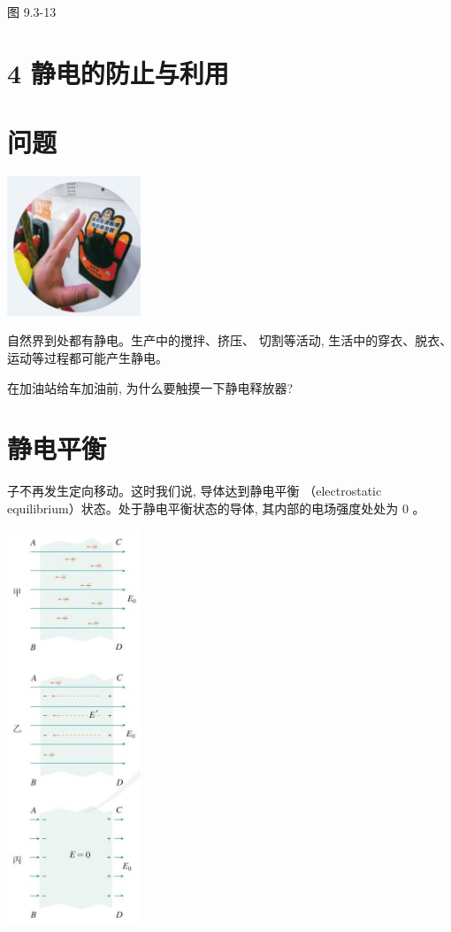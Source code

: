 \documentclass[10pt]{article}
\begin{document}
图 9.3-13

\section*{4 静电的防止与利用}

\section*{问题}

\begin{center}
\includegraphics[max width=0.3\textwidth]{images/01911d5f-8e38-70c0-b5b8-2b399bd115b6_23_269315.jpg}
\end{center}

自然界到处都有静电。生产中的搅拌、挤压、 切割等活动, 生活中的穿衣、脱衣、运动等过程都可能产生静电。

在加油站给车加油前, 为什么要触摸一下静电释放器?

\section*{静电平衡}

子不再发生定向移动。这时我们说, 导体达到静电平衡 （electrostatic equilibrium）状态。处于静电平衡状态的导体, 其内部的电场强度处处为 0 。

\begin{center}
\includegraphics[max width=0.3\textwidth]{images/01911d5f-8e38-70c0-b5b8-2b399bd115b6_23_587637.jpg}
\end{center}
\end{document}

